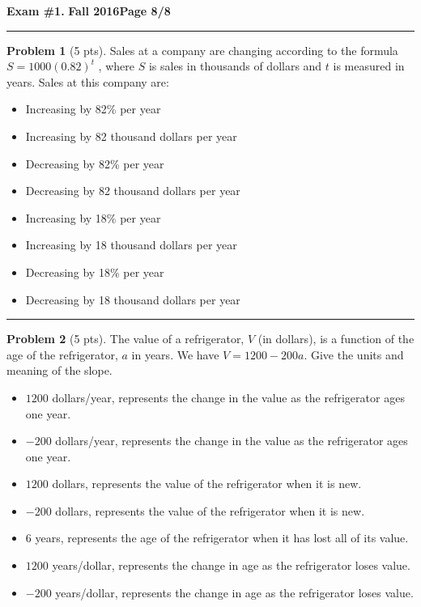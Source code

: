 \documentclass[12pt]{article}
\makeatletter
\theoremstyle{definition}
\newtheorem{problem}{Problem}
\newcommand*{\radiobutton}{%
  \@ifstar{\@radiobutton0}{\@radiobutton1}%
}
\newcommand*{\@radiobutton}[1]{%
  \begin{tikzpicture}
    \pgfmathsetlengthmacro\radius{height("X")/2}
    \draw[radius=\radius] circle;
    \ifcase#1 \fill[radius=.6*\radius] circle;\fi
  \end{tikzpicture}%
}
\makeatother
\begin{document}
\hfill{\large\bf Exam \#1.}\hfill{\large\bf
  Fall 2016}\hfill{\large\bf Page 8/8}\hrule

\bigskip
\begin{problem}[5 pts]
Sales at a company are changing according to the formula $S = 1000 (0.82)^t$ , where $S$ is sales in thousands of dollars and $t$ is measured in years. Sales at this company are:
\begin{itemize}
\item[\radiobutton] Increasing by 82\% per year
\item[\radiobutton] Increasing by 82 thousand dollars per year
\item[\radiobutton] Decreasing by 82\% per year
\item[\radiobutton] Decreasing by 82 thousand dollars per year
\item[\radiobutton] Increasing by 18\% per year
\item[\radiobutton] Increasing by 18 thousand dollars per year
\item[\radiobutton] Decreasing by 18\% per year
\item[\radiobutton] Decreasing by 18 thousand dollars per year
\end{itemize} 
\end{problem}
\hrule

\begin{problem}[5 pts]
The value of a refrigerator, $V$ (in dollars), is a function of the age of the refrigerator, $a$ in years. We have $V = 1200 - 200a$. Give the units and meaning of the slope.
\begin{itemize}
\item[\radiobutton] $1200$ dollars/year, represents the change in the value as the refrigerator ages one year.
\item[\radiobutton] $-200$ dollars/year, represents the change in the value as the refrigerator ages one year.
\item[\radiobutton] $1200$ dollars, represents the value of the refrigerator when it is new.
\item[\radiobutton] $-200$ dollars, represents the value of the refrigerator when it is new.
\item[\radiobutton] $6$ years, represents the age of the refrigerator when it has lost all of its value.
\item[\radiobutton] $1200$ years/dollar, represents the change in age as the refrigerator loses value.
\item[\radiobutton] $-200$ years/dollar, represents the change in age as the refrigerator loses value.
\end{itemize}
\end{problem}
\end{document}
